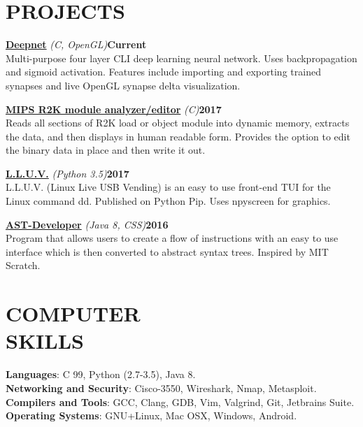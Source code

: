 \documentclass[line,margin]{res}
\begin{document}
\begin{resume}
\section{PROJECTS}
\par
    \href{https://github.com/jmp1617/deepnet.git}{\textbf{Deepnet}}
    {\sl (C, OpenGL)}\hfill \textbf{Current}\\ 
    Multi-purpose four layer CLI deep learning neural network. Uses
    backpropagation and sigmoid activation. Features include importing and 
    exporting trained synapses and live OpenGL synapse delta visualization.
\par
    \href{https://github.com/jmp1617/lmedit.git}
    {\textbf{MIPS R2K module analyzer/editor}}
    {\sl (C)}\hfill \textbf{2017}\\
    Reads all sections of R2K load or object module into dynamic memory, 
    extracts the data, and then displays in human readable form. Provides the 
    option to edit the binary data in place and then write it out.
\par
    \href{https://github.com/jmp1617/LLUV.git}{\textbf{L.L.U.V.}}
    {\sl (Python 3.5)}\hfill \textbf{2017}\\ 
    L.L.U.V. (Linux Live USB Vending) is an easy to use front-end TUI for the 
    Linux command dd. Published on Python Pip. Uses npyscreen for graphics.
\par
    \href{https://github.com/jmp1617/ast-developer.git}{\textbf{AST-Developer}}
    {\sl (Java 8, CSS)}\hfill \textbf{2016}\\ 
    Program that allows users to create a flow of instructions with an easy to
    use interface which is then converted to abstract syntax trees. Inspired by 
    MIT Scratch.

\section{COMPUTER\\SKILLS}
\textbf{Languages}: C 99, Python (2.7-3.5), Java 8.
\\
\textbf{Networking and Security}: Cisco-3550, Wireshark, Nmap, Metasploit.  
\\
\textbf{Compilers and Tools}: GCC, Clang, GDB, Vim, Valgrind, Git, 
Jetbrains Suite. 
\\
\textbf{Operating Systems}: 
GNU+Linux, Mac OSX, Windows, Android.


\end{resume}
\end{document}
